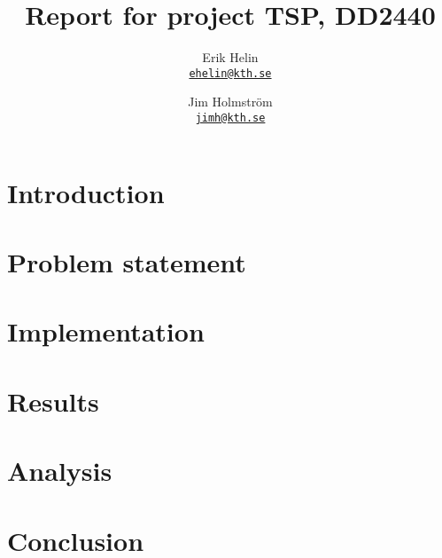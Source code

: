 \documentclass[11pt,oneside]{article}
\newcommand{\email}[1]{\href{mailto:#1}{\texttt{#1}}}
\begin{document}
\title{Report for project TSP, DD2440}
\author{Erik Helin \\ \email{ehelin@kth.se} \and 
        Jim Holmstr\"{o}m \\ \email{jimh@kth.se}}
\maketitle

\begin{abstract}
    
\end{abstract}

\clearpage
\tableofcontents
\clearpage

\section{Introduction}
\label{sec:introduction}


\section{Problem statement}
\label{sec:problem_statement}


\section{Implementation}
\label{sec:implementation}


\section{Results}
\label{sec:results}


\section{Analysis}
\label{sec:analysis}


\section{Conclusion}
\label{sec:conclusion}


\begin{thebibliography}{9}
    
\end{thebibliography}
\end{document}
